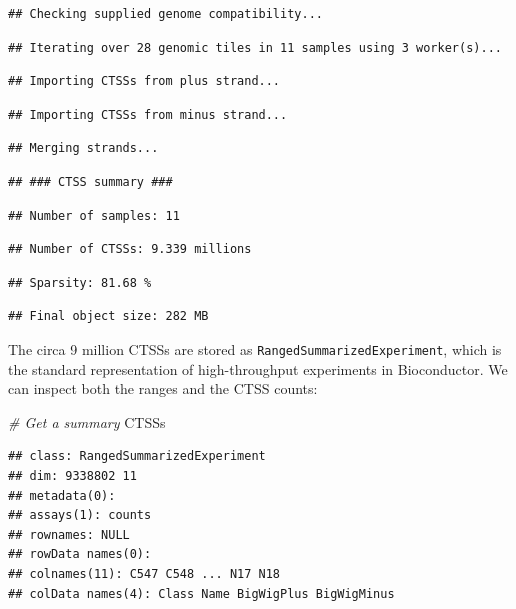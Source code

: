 \documentclass[9pt,a4paper,]{extarticle}
\newenvironment{Shaded}{\begin{snugshade}}{\end{snugshade}}
\newcommand{\CommentTok}[1]{\textcolor[rgb]{0.56,0.35,0.01}{\textit{{#1}}}}
\newcommand{\NormalTok}[1]{{#1}}
\begin{document}
\begin{verbatim}
## Checking supplied genome compatibility...
\end{verbatim}

\begin{verbatim}
## Iterating over 28 genomic tiles in 11 samples using 3 worker(s)...
\end{verbatim}

\begin{verbatim}
## Importing CTSSs from plus strand...
\end{verbatim}

\begin{verbatim}
## Importing CTSSs from minus strand...
\end{verbatim}

\begin{verbatim}
## Merging strands...
\end{verbatim}

\begin{verbatim}
## ### CTSS summary ###
\end{verbatim}

\begin{verbatim}
## Number of samples: 11
\end{verbatim}

\begin{verbatim}
## Number of CTSSs: 9.339 millions
\end{verbatim}

\begin{verbatim}
## Sparsity: 81.68 %
\end{verbatim}

\begin{verbatim}
## Final object size: 282 MB
\end{verbatim}

The circa 9 million CTSSs are stored as \texttt{RangedSummarizedExperiment}, which is the standard representation of high-throughput experiments in Bioconductor. We can inspect both the ranges and the CTSS counts:

\begin{Shaded}
\begin{Highlighting}[]
\CommentTok{# Get a summary}
\NormalTok{CTSSs}
\end{Highlighting}
\end{Shaded}

\begin{verbatim}
## class: RangedSummarizedExperiment 
## dim: 9338802 11 
## metadata(0):
## assays(1): counts
## rownames: NULL
## rowData names(0):
## colnames(11): C547 C548 ... N17 N18
## colData names(4): Class Name BigWigPlus BigWigMinus
\end{verbatim}
\end{document}
